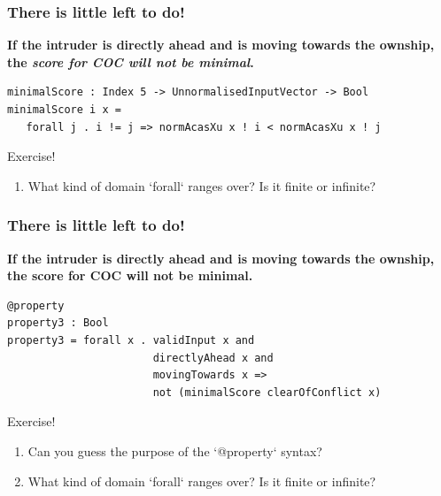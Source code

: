 \documentclass[t,compress,aspectratio=169]{beamer}
\begin{document}
\begin{frame}[fragile]
\frametitle{There is little left to do!}

\footnotesize{
\textbf{If the intruder is directly ahead and is moving towards the
 ownship, the \emph{score for COC will not be minimal}.}}

\pause

\begin{verbatim}
minimalScore : Index 5 -> UnnormalisedInputVector -> Bool
minimalScore i x =
   forall j . i != j => normAcasXu x ! i < normAcasXu x ! j
\end{verbatim}
\pause
\begin{block}{Exercise!}
\footnotesize{
\begin{enumerate}
\item What kind of domain  `forall` ranges over? Is it finite or infinite?
\end{enumerate}}
\end{block}

\end{frame}


\begin{frame}[fragile]
\frametitle{There is little left to do!}

\footnotesize{
\textbf{If the intruder is directly ahead and is moving towards the
 ownship, the score for COC will not be minimal.}}

\pause

\begin{verbatim}
@property
property3 : Bool
property3 = forall x . validInput x and
                       directlyAhead x and
                       movingTowards x =>
                       not (minimalScore clearOfConflict x)
\end{verbatim}
\pause
\begin{block}{Exercise!}
\footnotesize{
\begin{enumerate}
\item Can you guess the purpose of the `@property` syntax?
\item What kind of domain  `forall` ranges over? Is it finite or infinite?
\end{enumerate}}
\end{block}

\end{frame}
\end{document}
